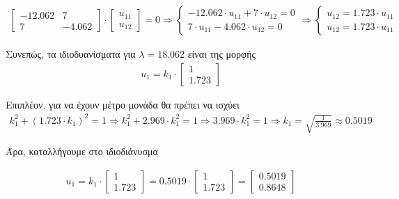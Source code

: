 \documentclass{article}
\begin{document}
	\pagebreak
	\begin{align*}	
		\begin{bmatrix}
			-12.062 & 7 \\
			7 & -4.062 
		\end{bmatrix} 
		\cdot
		\begin{bmatrix}
			u_{11} \\
			u_{12} 
		\end{bmatrix} = 0 \Rightarrow
		\begin{cases}
			-12.062 \cdot u_{11} + 7 \cdot u_{12} = 0 \\
			7 \cdot u_{11} - 4.062 \cdot u_{12} = 0
		\end{cases} \Rightarrow
		\begin{cases}
			u_{12} = 1.723 \cdot u_{11} \\
			u_{12} = 1.723 \cdot u_{11}
		\end{cases}
	\end{align*}

	\noindent
	Συνεπώς, τα ιδιοδυανίσματα για $λ = 18.062$ είναι της μορφής 
	\begin{align*}	
		u_{1} = k_{1} \cdot
		\begin{bmatrix}
			1 \\
			1.723 
		\end{bmatrix}
	\end{align*}

	\noindent
	Επιπλέον, για να έχουν μέτρο μονάδα θα πρέπει να ισχύει
	\begin{align*}	
		 k_{1}^2 + (1.723 \cdot k_{1})^2 = 1 \Rightarrow 
		 k_{1}^2 + 2.969 \cdot k_{1}^2 = 1 \Rightarrow 
		 3.969 \cdot k_{1}^2 = 1 \Rightarrow
		 k_{1} = \sqrt{\frac{1}{3.969}} \approx 0.5019
	\end{align*}	

	\noindent
	Άρα, καταλλήγουμε στο ιδιοδιάνυσμα
	
	\begin{align*}	
		u_{1} = 
		k_{1} \cdot
		\begin{bmatrix}
			1 \\
			1.723 
		\end{bmatrix} = 
		0.5019 \cdot
		\begin{bmatrix}
			1 \\
			1.723 
		\end{bmatrix} = 
		\begin{bmatrix}
			0.5019 \\
			0.8648 
		\end{bmatrix}
	\end{align*}
\end{document}
